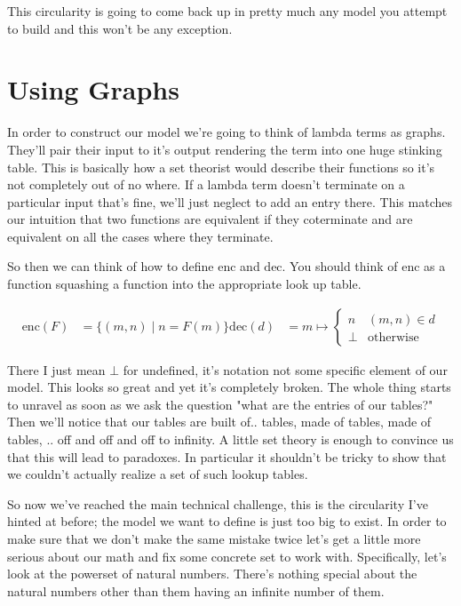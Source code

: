 \documentclass{amsart}
\newcommand{\enc}{\text{enc}}
\newcommand{\dec}{\text{dec}}
\begin{document}
This circularity is going to come back up in pretty much any model you
attempt to build and this won't be any exception.

\section{Using Graphs}

In order to construct our model we're going to think of lambda terms
as graphs. They'll pair their input to it's output rendering the term
into one huge stinking table. This is basically how a set theorist
would describe their functions so it's not completely out of no
where. If a lambda term doesn't terminate on a particular input that's
fine, we'll just neglect to add an entry there. This matches our
intuition that two functions are equivalent if they coterminate and
are equivalent on all the cases where they terminate.

So then we can think of how to define $\enc$ and $\dec$.
You should think of $\enc$ as a function squashing a
function into the appropriate look up table.

\begin{align*}
  \enc(F) &= \{(m, n) \mid n = F(m)\}
  \dec(d) &= m \mapsto
   \begin{cases}
      n & (m, n) \in d\\
      \bot & \text{otherwise}
   \end{cases}
\end{align*}

There I just mean $\bot$ for undefined, it's notation not some
specific element of our model. This looks so great and yet it's
completely broken. The whole thing starts to unravel as soon as we
ask the question "what are the entries of our tables?" Then we'll
notice that our tables are built of.. tables, made of tables, made of
tables, .. off and off and off to infinity. A little set theory is
enough to convince us that this will lead to paradoxes. In particular
it shouldn't be tricky to show that we couldn't actually realize a set
of such lookup tables.

So now we've reached the main technical challenge, this is the
circularity I've hinted at before; the model we want to define is just
too big to exist. In order to make sure that we don't make the same
mistake twice let's get a little more serious about our math and fix
some concrete set to work with. Specifically, let's look at the
powerset of natural numbers. There's nothing special about the natural
numbers other than them having an infinite number of them.
\end{document}
